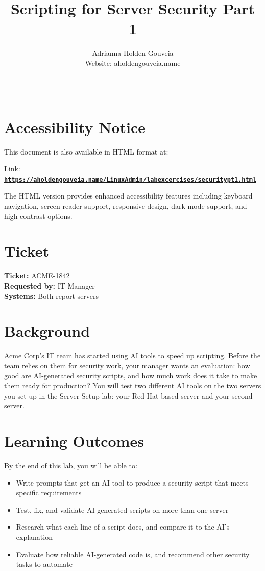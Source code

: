 \documentclass[12pt]{article}
\title{Scripting for Server Security Part 1}
\author{
        Adrianna Holden-Gouveia \\
        Website: \href{https://aholdengouveia.name}{aholdengouveia.name}\\ 
        \date{\vspace{-5ex}}
        \faGithub {: aholdengouveia} \\
        }
\begin{document}
    

\maketitle



\section*{Accessibility Notice}
This document is also available in HTML format at:

Link: \href{https://aholdengouveia.name/LinuxAdmin/labexcercises/securitypt1.html}{\textbf{\nolinkurl{https://aholdengouveia.name/LinuxAdmin/labexcercises/securitypt1.html}}}

The HTML version provides enhanced accessibility features including keyboard navigation, screen reader support, responsive design, dark mode support, and high contrast options.


\section*{Ticket}
\noindent\textbf{Ticket:} ACME-1842\\
\textbf{Requested by:} IT Manager\\
\textbf{Systems:} Both report servers

\section*{Background}
Acme Corp's IT team has started using AI tools to speed up scripting. Before the team relies on them for security work, your manager wants an evaluation: how good are AI-generated security scripts, and how much work does it take to make them ready for production? You will test two different AI tools on the two servers you set up in the Server Setup lab: your Red Hat based server and your second server.

\section*{Learning Outcomes}
By the end of this lab, you will be able to:
\begin{itemize}
    \item Write prompts that get an AI tool to produce a security script that meets specific requirements
    \item Test, fix, and validate AI-generated scripts on more than one server
    \item Research what each line of a script does, and compare it to the AI's explanation
    \item Evaluate how reliable AI-generated code is, and recommend other security tasks to automate
\end{itemize}
\end{document}
